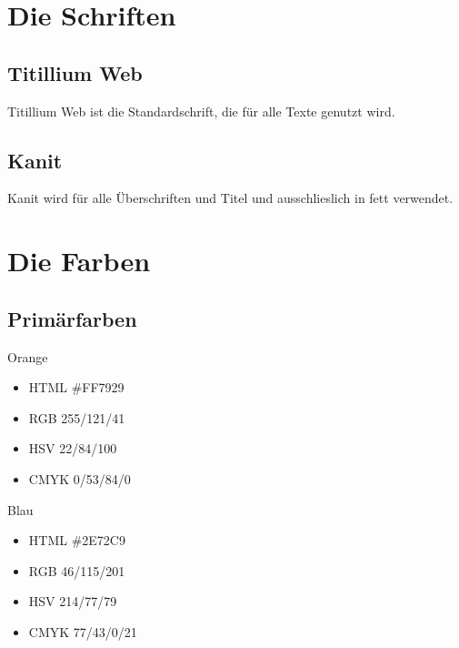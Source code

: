 \documentclass{article}
\begin{document}
\cleardoublepage
\section{Die Schriften}

\subsection{Titillium Web}
\begin{samepage}
Titillium Web ist die Standardschrift, die für alle Texte genutzt wird.

\end{samepage}

\subsection{Kanit}
\begin{samepage}
Kanit wird für alle Überschriften und Titel und ausschlieslich in fett verwendet.

\end{samepage}

\cleardoublepage
\section{Die Farben}

\subsection{Primärfarben}
\begin{samepage}
\cfield[LESOrange]
Orange
\begin{itemize}
\item HTML \#FF7929
\item RGB 255/121/41
\item HSV 22/84/100
\item CMYK 0/53/84/0
\end{itemize}
\end{samepage}

\begin{samepage}
\cfield[LESBlue]
Blau
\begin{itemize}
\item HTML \#2E72C9
\item RGB 46/115/201
\item HSV 214/77/79
\item CMYK 77/43/0/21
\end{itemize}
\end{samepage}
\end{document}
